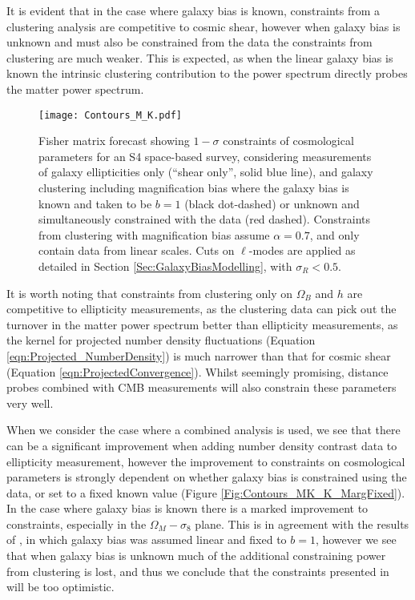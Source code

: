 \documentclass[useAMS,usenatbib,times,letter,amssymb]{mn2e}
\def\ATrue{0.7}
\begin{document}
It is evident that in the case where galaxy bias is known, constraints from a clustering analysis are competitive to cosmic shear, however when galaxy bias is unknown and must also be constrained from the data the constraints from clustering are much weaker. This is expected, as when the linear galaxy bias is known the intrinsic clustering contribution to the power spectrum directly probes the matter power spectrum. 

\begin{figure*}
\centering
\texttt{[image: Contours\_M\_K.pdf]}
\caption{Fisher matrix forecast showing $1-\sigma$ constraints of cosmological parameters for an S4 space-based survey, considering measurements of galaxy ellipticities only (``shear only'', solid blue line), and galaxy clustering including magnification bias where the galaxy bias is known and taken to be $b = 1$ (black dot-dashed) or unknown and simultaneously constrained with the data (red dashed). Constraints from clustering with magnification bias assume $\alpha = \ATrue$, and only contain data from linear scales. Cuts on $\ell$-modes are applied as detailed in Section \ref{Sec:GalaxyBiasModelling}, with $\sigma_R < 0.5$. }\label{Fig:Contours_M_K}
\end{figure*}

It is worth noting that constraints from clustering only on $\Omega_{B}$ and $h$ are competitive to ellipticity measurements, as the clustering data can pick out the turnover in the matter power spectrum better than ellipticity measurements, as the kernel for projected number density fluctuations (Equation \ref{eqn:Projected_NumberDensity}) is much narrower than that for cosmic shear (Equation \ref{eqn:ProjectedConvergence}). Whilst seemingly promising, distance probes combined with CMB measurements will also constrain these parameters very well.

When we consider the case where a combined analysis is used, we see that there can be a significant improvement when adding number density contrast data to ellipticity measurement, however the improvement to constraints on cosmological parameters is strongly dependent on whether galaxy bias is constrained using the data, or set to a fixed known value (Figure \ref{Fig:Contours_MK_K_MargFixed}). In the case where galaxy bias is known there is a marked improvement to constraints, especially in the $\Omega_M - \sigma_8$ plane. This is in agreement with the results of \cite{VanWaerbeke:2010p8}, in which galaxy bias was assumed linear and fixed to $b=1$, however we see that when galaxy bias is unknown much of the additional constraining power from clustering is lost, and thus we conclude that the constraints presented in \cite{VanWaerbeke:2010p8} will be too optimistic. 
\end{document}

